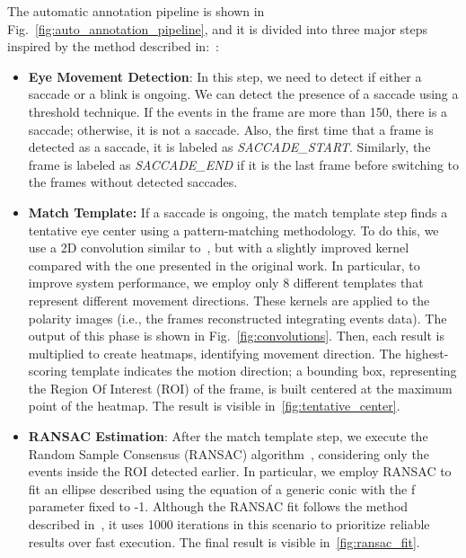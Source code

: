 The automatic annotation pipeline is shown in Fig.~\ref{fig:auto_annotation_pipeline}, and it is divided into three major steps inspired by the method described in:~\cite{mentasti2024event}:
\begin{itemize}
\item \textbf{Eye Movement Detection}: In this step, we need to detect if either a saccade or a blink is ongoing. We can detect the presence of a saccade using a threshold technique. If the events in the frame are more than 150, there is a saccade; otherwise, it is not a saccade. Also, the first time that a frame is detected as a saccade, it is labeled as \textit{SACCADE\_START}. Similarly, the frame is labeled as \textit{SACCADE\_END} if it is the last frame before switching to the frames without detected saccades.
\item \textbf{Match Template:} If a saccade is ongoing, the match template step finds a tentative eye center using a pattern-matching methodology. To do this, we use a 2D convolution similar to~\cite{mentasti2024event}, but with a slightly improved kernel compared with the one presented in the original work. In particular, to improve system performance, we employ only 8 different templates that represent different movement directions. These kernels are applied to the polarity images (i.e., the frames reconstructed integrating events data). The output of this phase is shown in Fig.~\ref{fig:convolutions}. Then, each result is multiplied to create heatmaps, identifying movement direction. The highest-scoring template indicates the motion direction; a bounding box, representing the Region Of Interest (ROI) of the frame, is built centered at the maximum point of the heatmap. The result is visible in~\ref{fig:tentative_center}.
\item \textbf{RANSAC Estimation}: After the match template step, we execute the Random Sample Consensus (RANSAC) algorithm~\cite{fischler1981random}, considering only the events inside the ROI detected earlier. In particular, we employ RANSAC to fit an ellipse described using the equation of a generic conic with the f parameter fixed to -1. Although the RANSAC fit follows the method described in~\cite{mentasti2024event}, it uses 1000 iterations in this scenario to prioritize reliable results over fast execution. The final result is visible in~\ref{fig:ransac_fit}.
\end{itemize}

